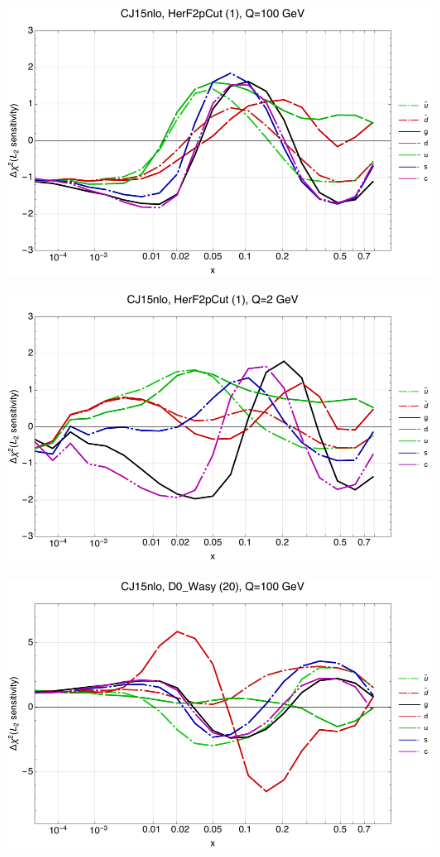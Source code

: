 \documentclass[10pt,aps,prd,floatfix,titlepage]{revtex4}
\begin{document}
\clearpage
\begin{figure}
\includegraphics[width=\textwidth,height=0.44\textheight,keepaspectratio]{1/1_CJ15nlo_L2_q100_Sf_1.pdf}
\caption{}
\end{figure}
\begin{figure}
\includegraphics[width=\textwidth,height=0.44\textheight,keepaspectratio]{1/1_CJ15nlo_L2_q2_Sf_1.pdf}
\caption{}
\end{figure}
\clearpage
\begin{figure}
\includegraphics[width=\textwidth,height=0.44\textheight,keepaspectratio]{1/20_CJ15nlo_L2_q100_Sf_1.pdf}
\caption{}
\end{figure}
\end{document}
